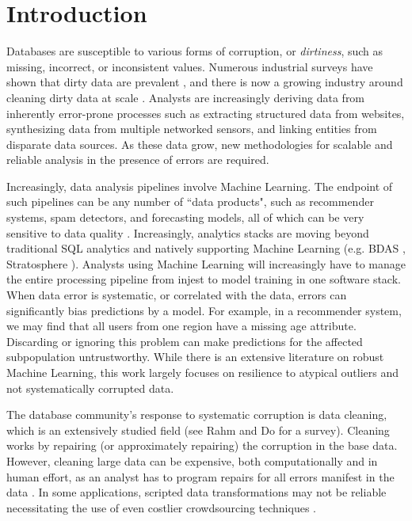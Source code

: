 \section{Introduction}
Databases are susceptible to various forms of corruption, or \emph{dirtiness}, such as missing, incorrect, or inconsistent values.
Numerous industrial surveys have shown that dirty data are prevalent \cite{Gartner}, and there is now a growing industry around cleaning dirty data at scale \cite{fortunearticle}.
Analysts are increasingly deriving data from inherently error-prone processes such as extracting structured data from websites, synthesizing data from multiple networked sensors, and linking entities from disparate data sources.
As these data grow, new methodologies for scalable and reliable analysis in the presence of errors are required. 

Increasingly, data analysis pipelines involve Machine Learning.
The endpoint of such pipelines can be any number of ``data products", such as recommender systems, spam detectors, and forecasting models, all of which can be very sensitive to data quality \cite{xiaofeature}.
Increasingly, analytics stacks are moving beyond traditional SQL analytics and natively supporting Machine Learning (e.g. BDAS \cite{bdas}, Stratosphere \cite{alexandrov2014stratosphere}).
Analysts using Machine Learning will increasingly have to manage the entire processing pipeline from injest to model training in one software stack.
When data error is systematic, or correlated with the data, errors can significantly bias predictions by a model.
For example, in a recommender system, we may find that all users from one region have a missing age attribute.
Discarding or ignoring this problem can make predictions for the affected subpopulation untrustworthy.
While there is an extensive literature on robust Machine Learning, this work largely focuses on resilience to atypical outliers and not systematically corrupted data.

The database community's response to systematic corruption is data cleaning, which is an extensively studied field (see Rahm and Do \cite{rahm2000data} for a survey).
Cleaning works by repairing (or approximately repairing) the corruption in the base data.
However, cleaning large data can be expensive, both computationally and in human effort, as an analyst has to program repairs for all errors manifest in the data \cite{kandel2012}.
In some applications, scripted data transformations may not be reliable necessitating the use of even costlier crowdsourcing techniques \cite{gokhale2014corleone,park2014crowdfill}.

